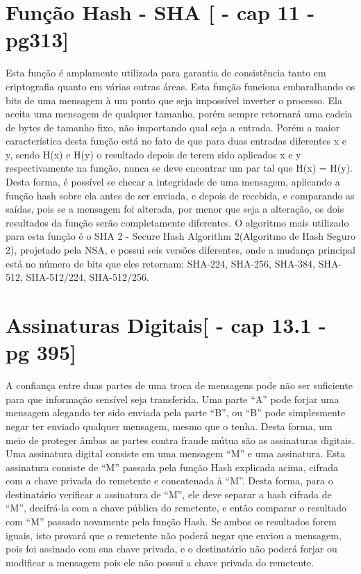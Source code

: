 \documentclass{article}
\begin{document}
	\section{Função Hash - SHA [\cite{STALLINS} - cap 11 - pg313]}
		\begin{flushleft}
			

    		\hspace{2cm} Esta função é amplamente utilizada para garantia de consistência tanto em criptografia quanto em várias outras áreas. Esta função funciona embaralhando os bits de uma mensagem à um ponto que seja impossível inverter o processo. Ela aceita uma mensagem de qualquer tamanho, porém sempre retornará uma cadeia de bytes de tamanho fixo, não importando qual seja a entrada. Porém a maior característica desta função está no fato de que para duas entradas diferentes x e y, sendo H(x) e H(y) o resultado depois de terem sido aplicados x e y respectivamente na função, nunca se deve encontrar um par tal que H(x) = H(y). Desta forma, é possível se checar a integridade de uma mensagem, aplicando a função hash sobre ela antes de ser enviada, e depois de recebida, e comparando as saídas, pois se a mensagem foi alterada, por menor que seja a alteração, os dois resultados da função serão completamente diferentes. O algoritmo mais utilizado para esta função é o SHA 2 - Secure Hash Algorithm 2(Algoritmo de Hash Seguro 2), projetado pela NSA, e possui seis versões diferentes, onde a mudança principal está no número de bits que eles retornam: SHA-224, SHA-256, SHA-384, SHA-512, SHA-512/224, SHA-512/256. 
			
		\end{flushleft}

	\section{Assinaturas Digitais[\cite{STALLINS} - cap 13.1 - pg 395]}
		\begin{flushleft}
			

			\hspace{2cm}A confiança entre duas partes de uma troca de mensagens pode não ser suficiente para que informação sensível seja transferida. Uma parte “A” pode forjar uma mensagem alegando ter sido enviada pela parte “B”, ou “B” pode simplesmente negar ter enviado qualquer mensagem, mesmo que o tenha. Desta forma, um meio de proteger âmbas as partes contra fraude mútua são as assinaturas digitais.
    Uma assinatura digital consiste em uma mensagem “M” e uma assinatura. Esta assinatura consiste de “M” passada pela função Hash explicada acima, cifrada com a chave privada do remetente e concatenada à “M”. Desta forma, para o destinatário verificar a assinatura de “M”, ele deve separar a hash cifrada de “M”, decifrá-la com a chave pública do remetente, e então comparar o resultado com “M” passado novamente pela função Hash. Se ambos os resultados forem iguais, isto provará que o remetente não poderá negar que enviou a mensagem, pois foi assinado com sua chave privada, e o destinatário não poderá forjar ou modificar a mensagem pois ele não possui a chave privada do remetente.
			
			
		\end{flushleft}
\end{document}
